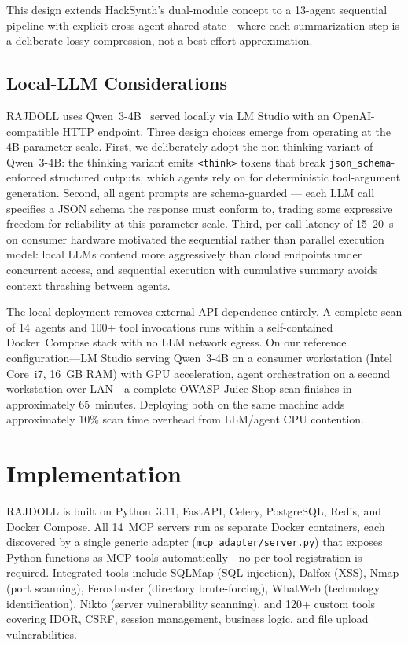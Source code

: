 \documentclass[conference]{IEEEtran}
\begin{document}
This design extends HackSynth's dual-module concept to a
13-agent sequential pipeline with explicit cross-agent shared
state---where each summarization step is a deliberate lossy
compression, not a best-effort approximation.

\subsection{Local-LLM Considerations}

RAJDOLL uses Qwen~3-4B~\cite{qwen3} served locally via LM Studio with an OpenAI-compatible HTTP endpoint. Three design choices emerge from operating at the 4B-parameter scale. First, we deliberately adopt the non-thinking variant of Qwen~3-4B: the thinking variant emits \texttt{<think>} tokens that break \texttt{json\_schema}-enforced structured outputs, which agents rely on for deterministic tool-argument generation. Second, all agent prompts are schema-guarded --- each LLM call specifies a JSON schema the response must conform to, trading some expressive freedom for reliability at this parameter scale. Third, per-call latency of 15--20~s on consumer hardware motivated the sequential rather than parallel execution model: local LLMs contend more aggressively than cloud endpoints under concurrent access, and sequential execution with cumulative summary avoids context thrashing between agents.

The local deployment removes external-API dependence entirely. A complete scan of 14~agents and 100+ tool invocations runs within a self-contained Docker~Compose stack with no LLM network egress. On our reference configuration---LM Studio serving Qwen~3-4B on a consumer workstation (Intel Core~i7, 16~GB RAM) with GPU acceleration, agent orchestration on a second workstation over LAN---a complete OWASP Juice Shop scan finishes in approximately 65~minutes. Deploying both on the same machine adds approximately 10\% scan time overhead from LLM/agent CPU contention.

\section{Implementation}

RAJDOLL is built on Python~3.11, FastAPI, Celery, PostgreSQL,
Redis, and Docker Compose. All 14~MCP servers run as separate
Docker containers, each discovered by a single generic adapter
(\texttt{mcp\_adapter/server.py}) that exposes Python functions
as MCP tools automatically---no per-tool registration is
required. Integrated tools include SQLMap (SQL injection), Dalfox
(XSS), Nmap (port scanning), Feroxbuster (directory
brute-forcing), WhatWeb (technology identification), Nikto
(server vulnerability scanning), and 120+ custom tools covering
IDOR, CSRF, session management, business logic, and file upload
vulnerabilities.
\end{document}
